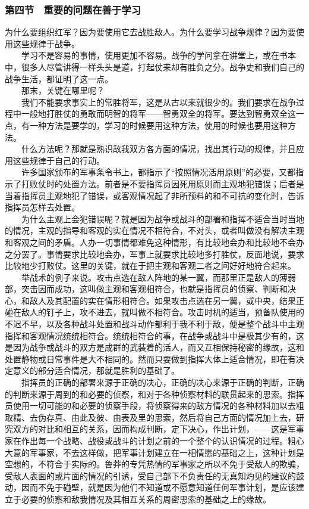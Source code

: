 \documentclass[cn,11pt,chinese]{elegantbook}
\def\myformat#1{\hfil\hfil #1}
\begin{document}
\subsubsection*{\myformat{第四节　重要的问题在善于学习}}
为什么要组织红军？因为要使用它去战胜敌人。为什么要学习战争规律？因为要使用这些规律于战争。\\
　　学习不是容易的事情，使用更加不容易。战争的学问拿在讲堂上，或在书本中，很多人尽管讲得一样头头是道，打起仗来却有胜负之分。战争史和我们自己的战争生活，都证明了这一点。\\
　　那末，关键在哪里呢？\\
　　我们不能要求事实上的常胜将军，这是从古以来就很少的。我们要求在战争过程中一般地打胜仗的勇敢而明智的将军——智勇双全的将军。要达到智勇双全这一点，有一种方法是要学的，学习的时候要用这种方法，使用的时候也要用这种方法。\\
　　什么方法呢？那就是熟识敌我双方各方面的情况，找出其行动的规律，并且应用这些规律于自己的行动。\\
　　许多国家颁布的军事条令书上，都指示了“按照情况活用原则”的必要，又都指示了打败仗时的处置方法。前者是不要指挥员因死用原则而主观地犯错误；后者是当着指挥员主观地犯了错误，或客观情况起了非所预料的和不可抗的变化时，告诉指挥员怎样去处置。\\
　　为什么主观上会犯错误呢？就是因为战争或战斗的部署和指挥不适合当时当地的情况，主观的指导和客观的实在情况不相符合，不对头，或者叫做没有解决主观和客观之间的矛盾。人办一切事情都难免这种情形，有比较地会办和比较地不会办之分罢了。事情要求比较地会办，军事上就要求比较地多打胜仗，反面地说，要求比较地少打败仗。这里的关键，就在于把主观和客观二者之间好好地符合起来。\\
　　举战术的例子来说。攻击点选在敌人阵地的某一翼，而那里正是敌人的薄弱部，突击因而成功，这叫做主观和客观相符合，也就是指挥员的侦察、判断和决心，和敌人及其配置的实在情形相符合。如果攻击点选在另一翼，或中央，结果正碰在敌人的钉子上，攻不进去，就叫做不相符合。攻击时机的适当，预备队使用的不迟不早，以及各种战斗处置和战斗动作都利于我不利于敌，便是整个战斗中主观指挥和客观情况统统相符合。统统相符合的事，在战争或战斗中是极其少有的，这是因为战争或战斗的双方是成群的武装着的活人，而又互相保持秘密的缘故，这和处置静物或日常事件是大不相同的。然而只要做到指挥大体上适合情况，即在有决定意义的部分适合情况，那就是胜利的基础了。\\
　　指挥员的正确的部署来源于正确的决心，正确的决心来源于正确的判断，正确的判断来源于周到的和必要的侦察，和对于各种侦察材料的联贯起来的思索。指挥员使用一切可能的和必要的侦察手段，将侦察得来的敌方情况的各种材料加以去粗取精、去伪存真、由此及彼、由表及里的思索，然后将自己方面的情况加上去，研究双方的对比和相互的关系，因而构成判断，定下决心，作出计划，——这是军事家在作出每一个战略、战役或战斗的计划之前的一个整个的认识情况的过程。粗心大意的军事家，不去这样做，把军事计划建立在一相情愿的基础之上，这种计划是空想的，不符合于实际的。鲁莽的专凭热情的军事家之所以不免于受敌人的欺骗，受敌人表面的或片面的情况的引诱，受自己部下不负责任的无真知灼见的建议的鼓动，因而不免于碰壁，就是因为他们不知道或不愿意知道任何军事计划，是应该建立于必要的侦察和敌我情况及其相互关系的周密思索的基础之上的缘故。\\
\end{document}
